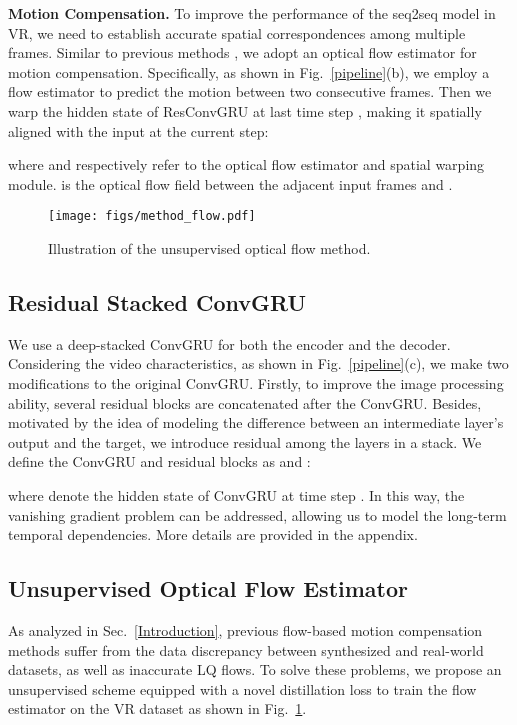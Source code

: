\documentclass[nohyperref]{article}
\theoremstyle{plain}
\theoremstyle{definition}
\theoremstyle{remark}
\begin{document}
\textbf{Motion Compensation.} To improve the performance of the seq2seq model in VR, we need to establish accurate spatial correspondences among multiple frames. Similar to previous methods \cite{r40,r24,r41,r25}, we adopt an optical flow estimator for motion compensation. Specifically, as shown in Fig.{~\ref{pipeline}(b)}, we employ a flow estimator to predict the motion between two consecutive frames. Then we warp the hidden state of ResConvGRU at last time step , making it spatially aligned with the input at the current step:

where  and  respectively refer to the optical flow estimator and  spatial warping module.  is the optical flow field between the adjacent input frames  and .
\begin{figure}[t!]
    \centering
    \texttt{[image: figs/method\_flow.pdf]}
    \vspace{-2.5mm} 
    \caption{Illustration of the unsupervised optical flow method.}
    \label{fig:method_flow}
\vspace{-3mm} 
\end{figure}
\vspace{-3mm}
\subsection{Residual Stacked ConvGRU}
\vspace{-1mm}
We use a deep-stacked ConvGRU for both the encoder and the decoder. Considering the video characteristics, as shown in Fig.~\ref{pipeline}(c), we make two modifications to the original ConvGRU. Firstly, to improve the image processing ability, several residual blocks are concatenated after the ConvGRU. Besides, motivated by the idea of modeling the difference between an intermediate layer's output and the target, we introduce residual among the layers in a stack. We define the ConvGRU and residual blocks as  and :

where  denote the hidden state of  ConvGRU at time step .
In this way, the vanishing gradient problem  can be addressed, allowing us to model the long-term temporal dependencies. More details are provided in the appendix. 
\vspace{-3mm}
\subsection{Unsupervised Optical Flow Estimator}
\vspace{-1mm} 
As analyzed in Sec.~\ref{Introduction}, previous flow-based motion compensation methods suffer from the data discrepancy between synthesized and real-world datasets, as well as inaccurate LQ flows. To solve these problems, we propose an unsupervised scheme equipped with a novel distillation loss to train the flow estimator on the VR dataset as shown in Fig.~\ref{fig:method_flow}.
\end{document}
